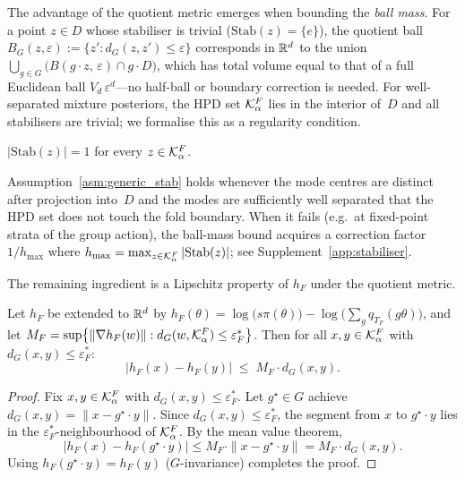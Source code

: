The advantage of the quotient metric emerges when bounding the
\emph{ball mass}.  For a point $z \in D$ whose stabiliser is trivial
($\mathrm{Stab}(z) = \{e\}$), the quotient ball
$B_G(z, \varepsilon) := \{z' : d_G(z, z') \leq \varepsilon\}$
corresponds in $\mathbb{R}^d$ to the union
$\bigcup_{g \in G}\bigl(B(g\!\cdot\!z,\,\varepsilon) \cap g\!\cdot\!D\bigr)$,
which has total volume equal to that of a full Euclidean ball
$V_d\,\varepsilon^d$---no half-ball or boundary correction is
needed.  For well-separated mixture posteriors, the HPD set
$\mathcal{K}_\alpha^F$ lies in the interior of~$D$ and all stabilisers are
trivial; we formalise this as a regularity condition.

\begin{assumption}\label{asm:generic_stab}
  $|\mathrm{Stab}(z)| = 1$ for every $z \in \mathcal{K}_\alpha^F$.
\end{assumption}

\noindent
Assumption~\ref{asm:generic_stab} holds whenever the mode centres are
distinct after projection into~$D$ and the modes are sufficiently
well separated that the HPD set does not touch the fold boundary.
When it fails (e.g.\ at fixed-point strata of the group action),
the ball-mass bound acquires a correction factor
$1/h_{\max}$ where
$h_{\max} = \max_{z \in \mathcal{K}_\alpha^F} |\mathrm{Stab}(z)|$;
see Supplement~\ref{app:stabiliser}.

The remaining ingredient is a Lipschitz property of $h_F$ under
the quotient metric.

\begin{lemma}\label{lem:lip_quotient}
  Let $h_F$ be extended to $\mathbb{R}^d$ by
  $h_F(\theta) = \log\bigl(s\pi(\theta)\bigr)
  - \log\bigl(\sum_g q_{T_F}(g\theta)\bigr)$,
  and let
  $M_F = \sup\bigl\{\|\nabla h_F(w)\| :
  d_G(w, \mathcal{K}_\alpha^F) \leq \varepsilon_F^*\bigr\}$.
  Then for all $x, y \in \mathcal{K}_\alpha^F$ with $d_G(x,y) \leq \varepsilon_F^*$:
  \begin{equation}\label{eq:lip_dG}
    |h_F(x) - h_F(y)| \;\leq\; M_F \cdot d_G(x, y).
  \end{equation}
\end{lemma}

\begin{proof}
  Fix $x, y \in \mathcal{K}_\alpha^F$ with $d_G(x,y) \leq \varepsilon_F^*$.
  Let $g^\star \in G$ achieve
  $d_G(x,y) = \|x - g^\star \cdot y\|$.
  Since $d_G(x,y) \leq \varepsilon_F^*$, the segment from $x$
  to $g^\star \cdot y$ lies in the
  $\varepsilon_F^*$-neighbourhood of $\mathcal{K}_\alpha^F$.
  By the mean value theorem,
  \[
    |h_F(x) - h_F(g^\star \cdot y)|
    \leq M_F \cdot \|x - g^\star \cdot y\|
    = M_F \cdot d_G(x,y).
  \]
  Using $h_F(g^\star \cdot y) = h_F(y)$ ($G$-invariance) completes
  the proof.
\end{proof}

